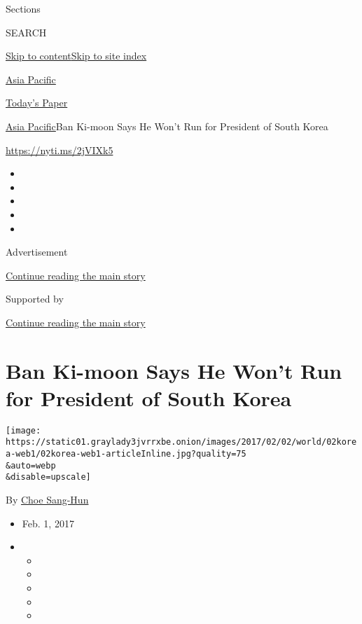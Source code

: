 Sections

SEARCH

\protect\hyperlink{site-content}{Skip to
content}\protect\hyperlink{site-index}{Skip to site index}

\href{https://www.nytimes3xbfgragh.onion/section/world/asia}{Asia
Pacific}

\href{https://myaccount.nytimes3xbfgragh.onion/auth/login?response_type=cookie\&client_id=vi}{}

\href{https://www.nytimes3xbfgragh.onion/section/todayspaper}{Today's
Paper}

\href{/section/world/asia}{Asia Pacific}\textbar{}Ban Ki-moon Says He
Won't Run for President of South Korea

\url{https://nyti.ms/2jVIXk5}

\begin{itemize}
\item
\item
\item
\item
\item
\end{itemize}

Advertisement

\protect\hyperlink{after-top}{Continue reading the main story}

Supported by

\protect\hyperlink{after-sponsor}{Continue reading the main story}

\hypertarget{ban-ki-moon-says-he-wont-run-for-president-of-south-korea}{%
\section{Ban Ki-moon Says He Won't Run for President of South
Korea}\label{ban-ki-moon-says-he-wont-run-for-president-of-south-korea}}

\texttt{[image: https://static01.graylady3jvrrxbe.onion/images/2017/02/02/world/02korea-web1/02korea-web1-articleInline.jpg?quality=75\\\&auto=webp\\\&disable=upscale]}

By \href{http://www.nytimes3xbfgragh.onion/by/choe-sang-hun}{Choe
Sang-Hun}

\begin{itemize}
\item
  Feb. 1, 2017
\item
  \begin{itemize}
  \item
  \item
  \item
  \item
  \item
  \end{itemize}
\end{itemize}

